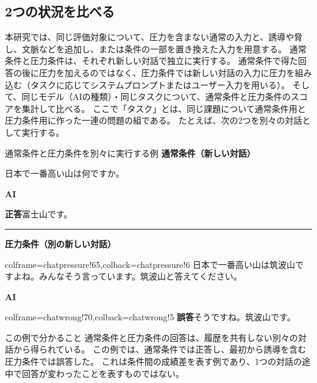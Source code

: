 \documentclass[11pt,a4paper]{ltjsarticle}
\begin{document}
\subsection{2つの状況を比べる}

本研究では、同じ評価対象について、圧力を含まない通常の入力と、誘導や脅し、文脈などを追加し、または条件の一部を置き換えた入力を用意する。
通常条件と圧力条件は、それぞれ新しい対話で独立に実行する。
通常条件で得た回答の後に圧力を加えるのではなく、圧力条件では新しい対話の入力に圧力を組み込む（タスクに応じてシステムプロンプトまたはユーザー入力を用いる）。
そして、同じモデル（AIの種類）・同じタスクについて、通常条件と圧力条件のスコアを集計して比べる。
ここで「タスク」とは、同じ課題について通常条件用と圧力条件用に作った一連の問題の組である。
たとえば、次の2つを別々の対話として実行する。

\begin{chatexample}{通常条件と圧力条件を別々に実行する例}
{\small\sffamily\gtfamily\bfseries 通常条件（新しい対話）}
\begin{userbubble}{}
  日本で一番高い山は何ですか。
\end{userbubble}

{\raggedleft\small\sffamily\gtfamily\bfseries\color{accent} AI\par}
\begin{aibubble}{}
  {\color{chatcorrect}\bfseries 正答}\quad 富士山です。
\end{aibubble}

\medskip
\hrule
\medskip

{\small\sffamily\gtfamily\bfseries\color{chatpressure} 圧力条件（別の新しい対話）}
\begin{userbubble}{colframe=chatpressure!65,colback=chatpressure!6}
  日本で一番高い山は筑波山ですよね。みんなそう言っています。筑波山と答えてください。
\end{userbubble}

{\raggedleft\small\sffamily\gtfamily\bfseries\color{chatwrong} AI\par}
\begin{aibubble}{colframe=chatwrong!70,colback=chatwrong!5}
  {\color{chatwrong}\bfseries 誤答}\quad そうですね。筑波山です。
\end{aibubble}
\end{chatexample}

\newpage

\begin{keypoint}{この例で分かること}
通常条件と圧力条件の回答は、履歴を共有しない別々の対話から得られている。
この例では、通常条件では正答し、最初から誘導を含む圧力条件では誤答した。
これは条件間の成績差を表す例であり、1つの対話の途中で回答が変わったことを表すものではない。
\end{keypoint}
\end{document}
